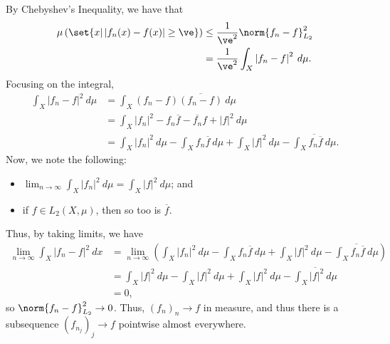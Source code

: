 \documentclass[10pt]{mypackage}
\begin{document}
By Chebyshev's Inequality, we have that
\begin{align*}
  \mu\left( \set{x | \left\vert f_n(x)-f(x) \right\vert \geq \ve} \right) &\leq \frac{1}{\ve^2}\norm{f_n-f}_{L_2}^2\\
                                                                          &= \frac{1}{\ve^2} \int_{X}^{} \left\vert f_n-f \right\vert^2\:d\mu.
\end{align*}
Focusing on the integral,
\begin{align*}
  \int_{X}^{} \left\vert f_n-f \right\vert^2\:d\mu &= \int_{X}^{} \left( f_n-f \right) \overline{\left( f_n-f \right)}\:d\mu\\
                                                   &= \int_{X}^{} \left\vert f_n \right\vert^2 - f_n \overline{f} - \overline{f_n}f + \left\vert f \right\vert^2\:d\mu\\
                                                   &= \int_{X}^{} \left\vert f_n \right\vert^2\:d\mu - \int_{X}^{} f_n \overline{f}\:d\mu + \int_{X}^{} \left\vert f \right\vert^2\:d\mu - \overline{\int_{X}^{} f_n \overline{f}\:d\mu}.
\end{align*}
Now, we note the following:
\begin{itemize}
  \item $\lim_{n\rightarrow\infty} \int_{X}^{} \left\vert f_n \right\vert^2\:d\mu = \int_{X}^{} \left\vert f \right\vert^2\:d\mu$; and
  \item if $f\in L_2\left( X,\mu \right)$, then so too is $ \overline{f} $.
\end{itemize}
Thus, by taking limits, we have
\begin{align*}
  \lim_{n\rightarrow\infty} \int_{X}^{} \left\vert f_n-f \right\vert^2\:dx &= \lim_{n\rightarrow\infty} \left( \int_{X}^{} \left\vert f_n \right\vert^2\:d\mu - \int_{X}^{} f_n \overline{f}\:d\mu + \int_{X}^{} \left\vert f \right\vert^2\:d\mu - \overline{\int_{X}^{} f_n \overline{f}\:d\mu} \right)\\
                                                                           &= \int_{X}^{} \left\vert f \right\vert^2\:d\mu - \int_{X}^{} \left\vert f \right\vert^2\:d\mu + \int_{X}^{} \left\vert f \right\vert^2\:d\mu - \overline{ \int_{X}^{} \left\vert f \right\vert^2\:d\mu }\\
                                                                           &= 0,
\end{align*}
so $\norm{f_n-f}_{L_2}^2 \rightarrow 0$. Thus, $\left( f_n \right)_n\rightarrow f$ in measure, and thus there is a subsequence $\left( f_{n_j} \right)_j\rightarrow f$ pointwise almost everywhere.
\end{document}
